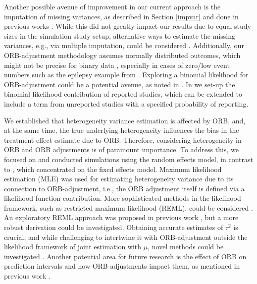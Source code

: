 \documentclass[twocolumn]{article}\usepackage[]{graphicx}\usepackage[]{xcolor}
\begin{document}
Another possible avenue of improvement in our current approach is the imputation of missing variances, as described in Section \ref{impvar} and done in previous works \citep{Copas2014, Copas2019, Bay, mythesis}. While this did not greatly impact our results due to equal study sizes in the simulation study setup, alternative ways to estimate the missing variances, e.g., via multiple imputation, could be considered \citep{var_imp, var_imp2}. Additionally, our ORB-adjustment methodology assumes normally distributed outcomes, which might not be precise for binary data \citep{Copas2014, Copas2019}, especially in cases of zero/low event numbers such as the epilepsy example from \citet{Copas2019}. Exploring a binomial likelihood for ORB-adjustment could be a potential avenue, as noted in \citet{mythesis}. In \citet{mythesis} we set-up the binomial likelihood contribution of reported studies, which can be extended to include a term from unreported studies with a specified probability of reporting.

We established that heterogeneity variance estimation is affected by ORB, and, at the same time, the true underlying heterogeneity influences the bias in the treatment effect estimate due to ORB. Therefore, considering heterogeneity in ORB and ORB adjustments is of paramount importance. To address this, we focused on and conducted simulations using the random effects model, in contrast to \citet{Copas2019}, which concentrated on the fixed effects model. Maximum likelihood estimation (MLE) was used for estimating heterogeneity variance due to its connection to ORB-adjustment, i.e.,  the ORB adjustment itself is defined via a likelihood function contribution. More sophisticated methods in the likelihood framework, such as restricted maximum likelihood (REML), could be considered \citep{REML, tauCI, REML2, mythesis}. An exploratory REML approach was proposed in previous work \citep{mythesis}, but a more robust derivation could be investigated. Obtaining accurate estimates of $\tau^2$ is crucial, and while challenging to intertwine it with ORB-adjustment outside the likelihood framework of joint estimation with $\mu$, novel methods could be investigated \citep{tauCI, REML, REML2}. Another potential area for future research is the effect of ORB on prediction intervals \citep{PI_coverage} and how ORB adjustments impact them, as mentioned in previous work \citep{mythesis}.
\end{document}
